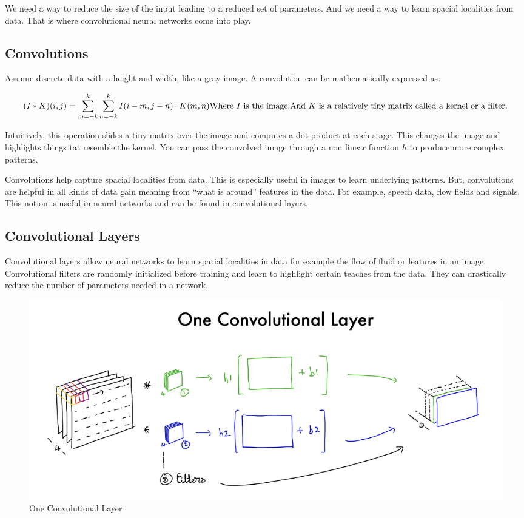 \documentclass[
]{article}
\begin{document}
We need a way to reduce the size of the input leading to a reduced set of parameters. And we need a way to learn spacial localities from data. That is where convolutional neural networks come into play.

\subsection{Convolutions}\label{convolutions}

Assume discrete data with a height and width, like a gray image. A convolution can be mathematically expressed as:

\[
(I * K)(i, j) = \sum_{m=-k}^{k} \sum_{n=-k}^{k} I(i-m, j-n) \cdot K(m, n)\\
\text{Where } I \text{ is the image.}\\
\text{And } K \text{ is a relatively tiny matrix called a kernel or a filter.}
\]

Intuitively, this operation slides a tiny matrix over the image and computes a dot product at each stage. This changes the image and highlights things tat resemble the kernel. You can pass the convolved image through a non linear function \(h\) to produce more complex patterns.

Convolutions help capture spacial localities from data. This is especially useful in images to learn underlying patterns. But, convolutions are helpful in all kinds of data gain meaning from ``what is around'' features in the data. For example, speech data, flow fields and signals. This notion is useful in neural networks and can be found in convolutional layers.

\subsection{Convolutional Layers}\label{convolutional-layers}

Convolutional layers allow neural networks to learn spatial localities in data for example the flow of fluid or features in an image. Convolutional filters are randomly initialized before training and learn to highlight certain teaches from the data. They can drastically reduce the number of parameters needed in a network.

\begin{figure}
\centering
\includegraphics{images/IMG_0008.jpg}
\caption{One Convolutional Layer}
\end{figure}
\end{document}
